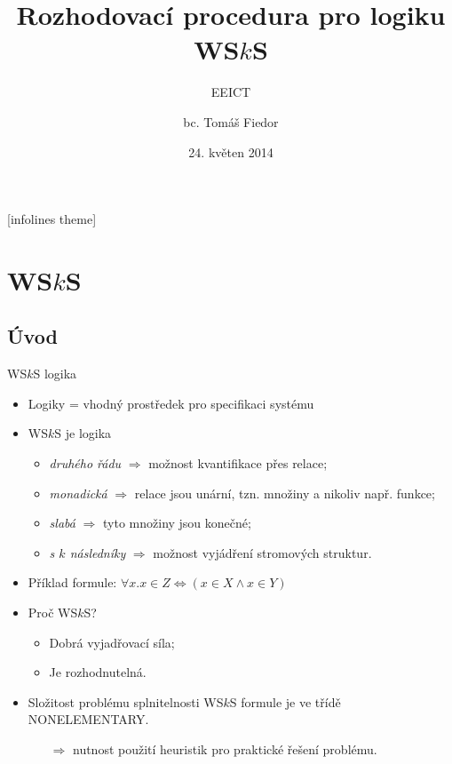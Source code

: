 \documentclass{beamer}
\title[Rozhodovací procedura pro logiku WS$k$S]{Rozhodovací procedura pro logiku
WS$k$S}
\subtitle{EEICT}
\author[T. Fiedor]{bc. Tomáš Fiedor}
\date{24. květen 2014}
\institute[vedoucí: Lengál]{pod vedením Ing. Ondřeje Lengála}
\begin{document}
[infolines theme]

  \begin{frame}[plain]
    \titlepage
  \end{frame}
	
	\section{WS$k$S}
	\subsection{Úvod}
	\begin{frame}{WS$k$S logika}
     \begin{itemize}
       \item Logiky = vhodný prostředek pro specifikaci systému
       \item WS$k$S je logika
       \begin{itemize}
         \pause
         \item \emph{druhého řádu} $\Rightarrow$ možnost kvantifikace přes
         relace;
         \pause
         \item \emph{monadická} $\Rightarrow$ relace jsou unární, tzn. množiny a
         nikoliv např. funkce;
         \pause
         \item \emph{slabá} $\Rightarrow$ tyto množiny jsou konečné;
         \pause
         \item \emph{s $k$ následníky} $\Rightarrow$ možnost vyjádření stromových
         struktur.
         \pause
       \end{itemize}
       \item Příklad formule: $\forall x. x \in Z \Leftrightarrow (x \in X
       \wedge x \in Y)$
       \pause
       \item Proč WS$k$S?
       \pause
       \begin{itemize}
         \item Dobrá vyjadřovací síla;
         \pause
         \item Je rozhodnutelná. 
       \end{itemize}
         \pause
         \item Složitost problému splnitelnosti WS$k$S formule je ve třídě
         NONELEMENTARY.
         \pause
         \begin{itemize}
           \item[$\Rightarrow$] nutnost použití heuristik pro praktické řešení
           problému.
         \end{itemize}
     \end{itemize}
	\end{frame}
	
\end{document}
